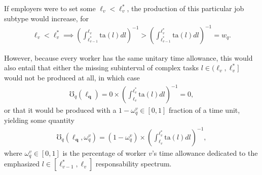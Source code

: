 \documentclass[hidelinks, nonatbib]{elsarticle}
\begin{document}
\begin{enumerate}
    If employers were to set some $\ell_v < \ell_{v}^{*}$, the production of this particular job subtype would increase, for
    \begin{align}
    \ell_v < \ell_{v}^{*}
    \implies
        \left(
            \int_{
                \ell_{v-1}^{*}
            }^{
                \ell_{v}
            }
            \text{ta}(l)dl
        \right) ^ {-1}
        >
        \left(
            \int_{
                \ell_{v-1}^{*}
            }^{
                \ell_{v}^{*}
            }
            \text{ta}(l)dl
        \right) ^ {-1}
        =
        w_q
        .
    \end{align}
    
    However, because every worker has the same unitary time allowance, this would also entail that either the missing subinterval of complex tasks $l \in (\ell_{v}, \ell_{v}^{*}]$ would not be produced at all, in which case
    \begin{align}
        \mho_{q}(\boldsymbol{\ell_{q}})
        =
        0
        \times
        \left(
            \int_{
                \ell_{v}
            }^{
                \ell_{v}^{*}
            }
            \text{ta}(l)dl
        \right) ^ {-1}
        =
        0
        ,
    \end{align}
    or that it would be produced with a $1 - \omega_{q}^{v} \in [0,1]$ fraction of a time unit, yielding some quantity
    \begin{align}
        \mho_{q}(
            \boldsymbol{\ell_{q}}
            ,\omega_{q}^{v}
        )
        =
        (1 - \omega_{q}^{v})
        \times
        \left(
            \int_{
                \ell_{v}
            }^{
                \ell_{v}^{*}
            }
            \text{ta}(l)dl
        \right) ^ {-1}
        ,
    \end{align}
    where $\omega_{q}^{v} \in [0,1]$ is the percentage of worker $v$'s time allowance dedicated to the emphasized $l \in [\ell_{v-1}^{*}, \ell_{v}]$ responsability spectrum.


\end{enumerate}
\end{document}
